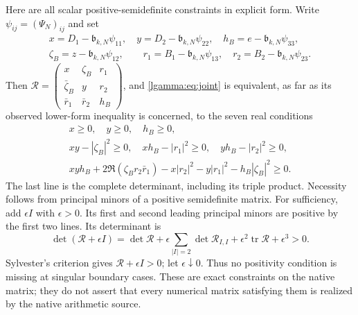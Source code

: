 Here are all scalar positive-semidefinite constraints in explicit form.
Write $\psi_{ij}=(\Psi_N)_{ij}$ and set
\begin{equation}\label{lgamma:eq:resentries}
 \begin{gathered}
 x=D_1-\mathfrak b_{k,N}\psi_{11},\quad
 y=D_2-\mathfrak b_{k,N}\psi_{22},\quad
 h_B=e-\mathfrak b_{k,N}\psi_{33},\\
 \zeta_B=z-\mathfrak b_{k,N}\psi_{12},\qquad
 r_1=B_1-\mathfrak b_{k,N}\psi_{13},\quad
 r_2=B_2-\mathfrak b_{k,N}\psi_{23}.
 \end{gathered}
\end{equation}
Then $\mathcal R=\left(\begin{smallmatrix}
x&\zeta_B&r_1\\\bar\zeta_B&y&r_2\\\bar r_1&\bar r_2&h_B
\end{smallmatrix}\right)$, and \eqref{lgamma:eq:joint} is equivalent, as far
as its observed lower-form inequality is concerned, to the seven real
conditions
\begin{equation}\label{lgamma:eq:allminors}
 \boxed{\begin{gathered}
 x\ge0,\quad y\ge0,\quad h_B\ge0,\\
 xy-|\zeta_B|^2\ge0,\quad xh_B-|r_1|^2\ge0,
 \quad yh_B-|r_2|^2\ge0,\\
 xyh_B+2\Re(\zeta_Br_2\bar r_1)
 -x|r_2|^2-y|r_1|^2-h_B|\zeta_B|^2\ge0.
 \end{gathered}}
\end{equation}
The last line is the complete determinant, including its triple product.
Necessity follows from principal minors of a positive semidefinite
matrix.  For sufficiency, add $\epsilon I$ with $\epsilon>0$.
Its first and second leading principal minors are positive by the
first two lines.  Its determinant is
\[
 \det(\mathcal R+\epsilon I)
 =\det\mathcal R+
 \epsilon\sum_{|I|=2}\det\mathcal R_{I,I}
 +\epsilon^2\operatorname{tr}\mathcal R+\epsilon^3>0.
\]
Sylvester's criterion gives
$\mathcal R+\epsilon I>0$; let $\epsilon\downarrow0$.
Thus no positivity condition is missing at singular boundary cases.
These are exact constraints on the native matrix; they do not assert
that every numerical matrix satisfying them is realized by the native
arithmetic source.


